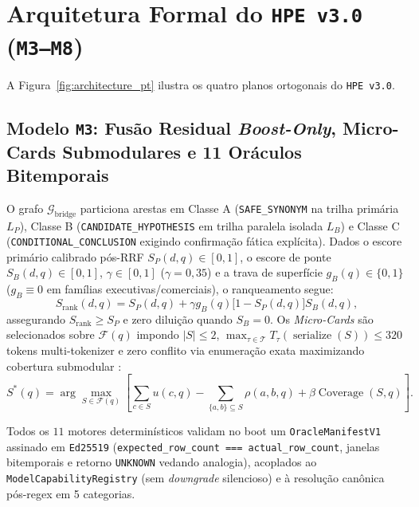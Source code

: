\documentclass[10pt,twocolumn]{article}
\begin{document}
\section{Arquitetura Formal do \texttt{HPE v3.0} (\texttt{M3--M8})}

A Figura~\ref{fig:architecture_pt} ilustra os quatro planos ortogonais do \texttt{HPE v3.0}.

\subsection{Modelo \texttt{M3}: Fus\~ao Residual \emph{Boost-Only}, Micro-Cards Submodulares e 11 Or\'aculos Bitemporais}

O grafo $\mathcal{G}_{\mathrm{bridge}}$ particiona arestas em Classe A (\texttt{SAFE\_SYNONYM} na trilha prim\'aria $L_P$), Classe B (\texttt{CANDIDATE\_HYPOTHESIS} em trilha paralela isolada $L_B$) e Classe C (\texttt{CONDITIONAL\_CONCLUSION} exigindo confirma\c{c}\~ao f\'atica expl\'icita). Dados o escore prim\'ario calibrado p\'os-RRF \cite{cormack2009reciprocal} $S_P(d,q) \in [0,1]$, o escore de ponte $S_B(d,q) \in [0,1]$, $\gamma \in [0,1]$ ($\gamma=0,35$) e a trava de superf\'icie $g_B(q) \in \{0,1\}$ ($g_B \equiv 0$ em fam\'ilias executivas/comerciais), o ranqueamento segue:
\begin{equation}
S_{\mathrm{rank}}(d,q) = S_P(d,q) + \gamma g_B(q)\bigl[1 - S_P(d,q)\bigr]S_B(d,q),
\end{equation}
assegurando $S_{\mathrm{rank}} \ge S_P$ e zero dilui\c{c}\~ao quando $S_B=0$. Os \emph{Micro-Cards} s\~ao selecionados sobre $\mathcal{F}(q)$ impondo $|S|\le 2$, $\max_{\tau \in \mathcal{T}} T_\tau(\operatorname{serialize}(S)) \le 320$ tokens multi-tokenizer e zero conflito via enumera\c{c}\~ao exata maximizando cobertura submodular \cite{nemhauser1978analysis}:
\begin{equation}
S^*(q) = \arg\max_{S \in \mathcal{F}(q)} \left[\sum_{c \in S} u(c,q) - \!\!\sum_{\{a,b\}\subseteq S}\!\! \rho(a,b,q) + \beta \operatorname{Coverage}(S,q)\right].
\end{equation}

Todos os $11$ motores determin\'isticos validam no boot um \texttt{OracleManifestV1} assinado em \texttt{Ed25519} (\texttt{expected\_row\_count === actual\_row\_count}, janelas bitemporais e retorno \texttt{UNKNOWN} vedando analogia), acoplados ao \texttt{ModelCapabilityRegistry} (sem \emph{downgrade} silencioso) e \`a resolu\c{c}\~ao can\^onica p\'os-regex em 5 categorias.
\end{document}
